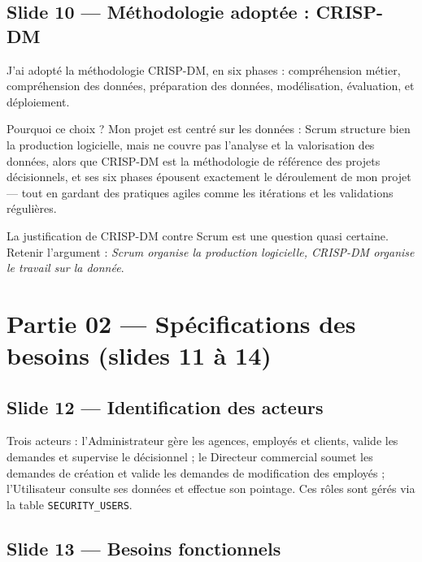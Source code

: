 \documentclass[a4paper,11pt]{article}
\begin{document}
\subsection*{Slide 10 --- Méthodologie adoptée : CRISP-DM}

J'ai adopté la méthodologie CRISP-DM, en six phases : compréhension métier,
compréhension des données, préparation des données, modélisation, évaluation,
et déploiement.

Pourquoi ce choix ? Mon projet est centré sur les données : Scrum structure bien
la production logicielle, mais ne couvre pas l'analyse et la valorisation des
données, alors que CRISP-DM est la méthodologie de référence des projets
décisionnels, et ses six phases épousent exactement le déroulement de mon
projet --- tout en gardant des pratiques agiles comme les itérations et les
validations régulières.

\begin{coeur}
La justification de CRISP-DM contre Scrum est une question quasi certaine.
Retenir l'argument : \emph{Scrum organise la production logicielle, CRISP-DM
organise le travail sur la donnée}.
\end{coeur}

\section*{Partie 02 --- Spécifications des besoins (slides 11 à 14)}


\subsection*{Slide 12 --- Identification des acteurs}

Trois acteurs : l'Administrateur gère les agences, employés et clients, valide
les demandes et supervise le décisionnel ; le Directeur commercial soumet les
demandes de création et valide les demandes de modification des employés ;
l'Utilisateur consulte ses données et effectue son pointage. Ces rôles sont
gérés via la table \texttt{SECURITY\_USERS}.

\subsection*{Slide 13 --- Besoins fonctionnels}
\end{document}
